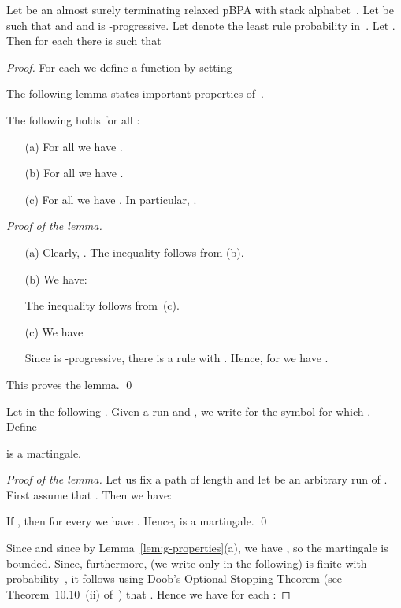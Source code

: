 \begin{proposition} \label{prop:critical-u-progressive}
 Let  be an almost surely terminating relaxed pBPA with stack alphabet~.
 Let  be such that  and  and  is -progressive.
 Let  denote the least rule probability in~.
 Let .
 Then for each  there is  such that
   
\end{proposition}
\begin{proof}
For each  we define a function  by setting
 
The following lemma states important properties of~.
\begin{lemma} \label{lem:g-properties}
  The following holds for all :
  \begin{itemize}
    \item[(a)]
     For all  we have .
    \item[(b)]
     For all  we have .
    \item[(c)]
     For all  we have . In particular, .
  \end{itemize}
\end{lemma}
\begin{proof}[Proof of the lemma]\mbox{}
 \begin{itemize}
  \item[(a)]
   Clearly, .
   The inequality  follows from (b).
  \item[(b)]
   We have:
   
   The inequality  follows from~(c).
  \item[(c)]
   We have
   
   Since  is -progressive, there is a rule  with .
   Hence, for  we have .
 \end{itemize}
This proves the lemma.
\qed
\end{proof}

Let in the following .
Given a run  and , we write  for the symbol  for which .
Define
 

\begin{lemma} \label{lem:exponential-martingale}
 is a martingale.
\end{lemma}
\begin{proof}[Proof of the lemma]
Let us fix a path  of length  and let  be an arbitrary run of .
First assume that .
Then we have:

If , then for every  we have .
Hence,  is a martingale.
\qed
\end{proof}

Since  and since  by Lemma~\ref{lem:g-properties}(a),
 we have , so the martingale is bounded.
Since, furthermore,  (we write only  in the following) is finite with probability~,
 it follows using Doob's Optional-Stopping Theorem (see Theorem~10.10~(ii) of~\cite{book:Williams})
 that .
Hence we have for each :


\end{proof}
